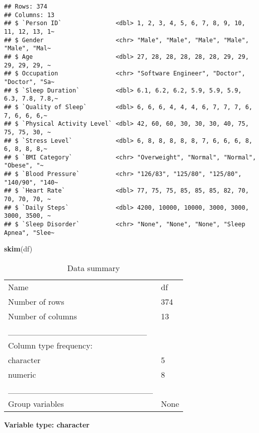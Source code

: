 \documentclass[
]{article}
\newenvironment{Shaded}{\begin{snugshade}}{\end{snugshade}}
\newcommand{\FunctionTok}[1]{\textcolor[rgb]{0.13,0.29,0.53}{\textbf{#1}}}
\newcommand{\NormalTok}[1]{#1}
\begin{document}
\begin{verbatim}
## Rows: 374
## Columns: 13
## $ `Person ID`               <dbl> 1, 2, 3, 4, 5, 6, 7, 8, 9, 10, 11, 12, 13, 1~
## $ Gender                    <chr> "Male", "Male", "Male", "Male", "Male", "Mal~
## $ Age                       <dbl> 27, 28, 28, 28, 28, 28, 29, 29, 29, 29, 29, ~
## $ Occupation                <chr> "Software Engineer", "Doctor", "Doctor", "Sa~
## $ `Sleep Duration`          <dbl> 6.1, 6.2, 6.2, 5.9, 5.9, 5.9, 6.3, 7.8, 7.8,~
## $ `Quality of Sleep`        <dbl> 6, 6, 6, 4, 4, 4, 6, 7, 7, 7, 6, 7, 6, 6, 6,~
## $ `Physical Activity Level` <dbl> 42, 60, 60, 30, 30, 30, 40, 75, 75, 75, 30, ~
## $ `Stress Level`            <dbl> 6, 8, 8, 8, 8, 8, 7, 6, 6, 6, 8, 6, 8, 8, 8,~
## $ `BMI Category`            <chr> "Overweight", "Normal", "Normal", "Obese", "~
## $ `Blood Pressure`          <chr> "126/83", "125/80", "125/80", "140/90", "140~
## $ `Heart Rate`              <dbl> 77, 75, 75, 85, 85, 85, 82, 70, 70, 70, 70, ~
## $ `Daily Steps`             <dbl> 4200, 10000, 10000, 3000, 3000, 3000, 3500, ~
## $ `Sleep Disorder`          <chr> "None", "None", "None", "Sleep Apnea", "Slee~
\end{verbatim}

\begin{Shaded}
\begin{Highlighting}[]
\FunctionTok{skim}\NormalTok{(df)}
\end{Highlighting}
\end{Shaded}

\begin{longtable}[]{@{}ll@{}}
\caption{Data summary}\tabularnewline
\toprule\noalign{}
\endfirsthead
\endhead
\bottomrule\noalign{}
\endlastfoot
Name & df \\
Number of rows & 374 \\
Number of columns & 13 \\
\_\_\_\_\_\_\_\_\_\_\_\_\_\_\_\_\_\_\_\_\_\_\_ & \\
Column type frequency: & \\
character & 5 \\
numeric & 8 \\
\_\_\_\_\_\_\_\_\_\_\_\_\_\_\_\_\_\_\_\_\_\_\_\_ & \\
Group variables & None \\
\end{longtable}

\textbf{Variable type: character}
\end{document}
